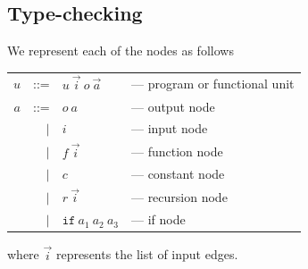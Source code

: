 \documentclass[12pt,UTF8,a4]{article}
\newcommand{\code}[1]{\texttt{#1}}
\begin{document}
\clearpage

\subsection{Type-checking}
We represent each of the nodes as follows
\begin{center}
  \begin{tabular}{rrll}
    $u$ & ::= & $u\ \vec{i}\ o\ \vec{a}$ & --- program or functional unit
    \\
    $a$ & ::= & $o\ a$ & --- output node
    \\
    & $|$ & $i$ &  --- input node
    \\
    & $|$ & $f\ \vec{i}$ &  --- function node
    \\
    & $|$ & $c$ &  --- constant node
    \\
    & $|$ & $r\ \vec{i}$ &  --- recursion node
    \\
    & $|$ & $\code{if}\ a_1\ a_2\ a_3$ &  --- if node
    \\
  \end{tabular}
\end{center}
where $\vec{i}$ represents the list of input edges.
\end{document}
